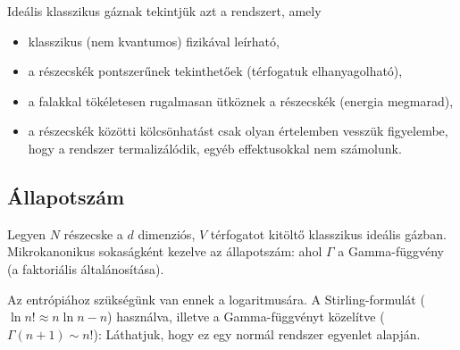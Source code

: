   Ideális klasszikus gáznak tekintjük azt a rendszert, amely
  \begin{itemize}
   \item klasszikus (nem kvantumos) fizikával leírható,
   \item a részecskék pontszerűnek tekinthetőek (térfogatuk elhanyagolható),
   \item a falakkal tökéletesen rugalmasan ütköznek a részecskék (energia megmarad),
   \item a részecskék közötti kölcsönhatást csak olyan értelemben vesszük figyelembe, hogy a rendszer termalizálódik, egyéb effektusokkal nem számolunk.
  \end{itemize}
  
  \subsection{Állapotszám}
  
   Legyen $N$ részecske a $d$ dimenziós, $V$ térfogatot kitöltő klasszikus ideális gázban. Mikrokanonikus sokaságként kezelve az állapotszám:
   ahol $\Gamma$ a Gamma-függvény (a faktoriális általánosítása).
   
   Az entrópiához szükségünk van ennek a logaritmusára. A Stirling-formulát ($\ln n!\approx n\ln n-n$) használva, illetve a Gamma-függvényt közelítve ($\Gamma(n+1)\sim n!$): 
   Láthatjuk, hogy ez egy normál rendszer  egyenlet alapján. 
   

